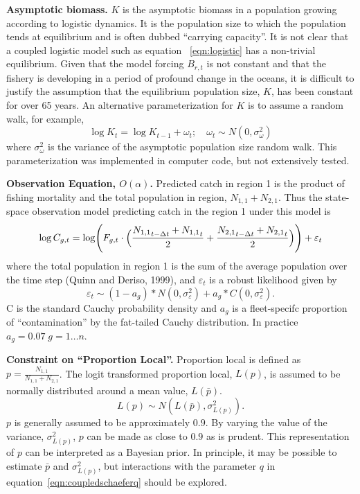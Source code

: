 \documentclass[12pt,letterpaper,twoside]{article}
\newcommand\None{{N_{1,1}}}
\newcommand\Ntwo{{N_{2,1}}}
\newcommand\Nsum{{N_{1,1}+N_{2,1}}}
\begin{document}
{\bf Asymptotic biomass.}
$K$ is the asymptotic biomass in a population growing according to
logistic dynamics. It is the population size to which the population
tends at equilibrium and is often dubbed ``carrying capacity''. 
It is not clear that a coupled logistic model such as equation~
\ref{eqn:logistic} has a non-trivial equilibrium. 
Given that the model forcing $B_{r,t}$ is not constant and that the
fishery is developing in a period of profound change in the oceans,
it is difficult to justify the assumption that the equilibrium
population size, $K$, has been constant for over 65 years. An
alternative parameterization for $K$ is to assume a random walk, for
example,
\begin{equation}
\log K_t = \log K_{t-1} + \omega_t;\quad \omega_t\sim
N(0,\sigma^2_\omega) \label{eqn:Kwalk}
\end{equation}
where  $\sigma^2_\omega$ is the variance of the
asymptotic population size random walk.
This parameterization was implemented in computer code, but not extensively
tested.

{\bf Observation Equation, $O(\alpha)$.}
Predicted catch in region 1 is the product of fishing mortality
and the total population in region, $\None+\Ntwo$.
Thus the state-space observation model predicting catch in the region 1
under this model is
\begin{equation}
\log C_{g,t} = \log \Biggl(F_{g,t}\cdot\Bigl(\frac{\None_{t-\Delta t}+\None_t}{2}
                           +\frac{\Ntwo_{t-\Delta
t}+\Ntwo_t}{2}\Bigr)\Biggr) + \varepsilon_t
\label{eqn:obs}
\end{equation}
where the total population in region 1 is the sum of the average
population over the time step (Quinn and Deriso, 1999), and
$\varepsilon_t$ is a robust likelihood given by
\begin{equation}
\varepsilon_t \sim (1-a_g)*N(0,\sigma^2_\varepsilon)+a_g*C(0,\sigma^2_\varepsilon).
\end{equation}
C is the standard Cauchy probability density and $a_g$ is a
fleet-specifc proportion of ``contamination'' by the fat-tailed Cauchy
distribution. In practice $a_g = 0.07\; g=1\ldots n$.

{\bf Constraint on ``Proportion Local''.}
Proportion local is defined as $p = \frac{\None}{\Nsum}$. The logit
transformed proportion local, $L(p)$, is assumed to be normally
distributed around a mean value, $L(\bar{p})$.
\begin{equation}
\label{eqn:LpropL}
L(p)\sim N(L(\bar{p}),\sigma^2_{L(p)}).
\end{equation} 
$p$ is generally assumed to be approximately $0.9$. By varying the
value of the variance, $\sigma^2_{L(p)}$, $p$ can be made as
close to $0.9$ as is prudent.
This representation of $p$ can be interpreted as a Bayesian prior.
In principle, it may be possible to
estimate $\bar{p}$ and $\sigma^2_{L(p)}$, but interactions with
the parameter $q$ in equation~\ref{eqn:coupledschaeferq} should be
explored.
\end{document}
